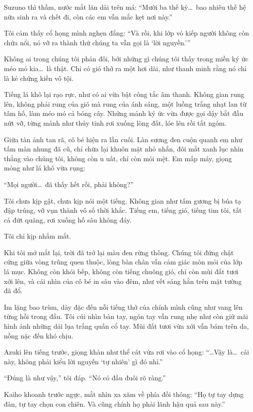 \documentclass[../main.tex]{subfiles}
\begin{document}
Suzuno thì thầm, nước mắt lăn dài trên má: ``Mười ba thế kỷ\dots\ bao nhiêu thế hệ nữa sinh ra và chết đi, còn các em vẫn mắc kẹt nơi này.''

Tôi cảm thấy cổ họng mình nghẹn đắng: ``Và rồi, khi lớp vỏ kiếp người không còn chứa nổi, nó vỡ ra thành thứ chúng ta vẫn gọi là `lời nguyền.'''

Không ai trong chúng tôi phản đối, bởi những gì chúng tôi thấy trong miền ký ức méo mó kia\dots\ là thật. Chỉ có gió thở ra một hơi dài, như thanh minh rằng nó chỉ là kẻ chứng kiến vô tội.

Tiếng lá khô lại rạo rực, như có ai vừa bật công tắc âm thanh. Không gian rung lên, không phải rung của gió mà rung của ánh sáng, một luồng trắng nhạt lan từ tâm hố, làm méo mó cả bóng cây. Những mảnh ký ức vừa được gọi dậy bắt đầu nứt vỡ, từng mảnh như thủy tinh rơi xuống lòng đất, lóe lên rồi tắt ngóm.

Giữa tàn ảnh tan rã, cô bé hiện ra lần cuối. Làn sương đen cuộn quanh em như tấm màn nhung đã cũ, chỉ chừa lại khuôn mặt nhỏ nhắn, đôi mắt xanh lục nhìn thẳng vào chúng tôi, không còn u uất, chỉ còn mỏi mệt. Em mấp máy, giọng mỏng như lá khô vừa rụng:

``Mọi người\dots\ đã thấy hết rồi, phải không?''

Tôi chưa kịp gật, chưa kịp nói một tiếng. Không gian như tấm gương bị búa tạ đập trúng, vỡ vụn thành vô số thời khắc. Tiếng em, tiếng gió, tiếng tim tôi, tất cả đứt quãng, rơi xuống hố sâu không đáy.

Tôi chỉ kịp nhắm mắt.

Khi tôi mở mắt lại, trời đã trở lại màu đen rừng thông. Chúng tôi đứng chật cứng giữa vòng trũng quen thuộc, lòng bàn chân vẫn cảm giác mòn mỏi của lớp lá mục. Không còn khói bếp, không còn tiếng chuông gió, chỉ còn mùi đất tươi xới lên, và cái nhìn của cô bé in sâu vào đêm, như vết sáng hằn trên mặt tường đã đổ.

Im lặng bao trùm, dày đặc đến nỗi tiếng thở của chính mình cũng như vang lên từng hồi trong đầu. Tôi cúi nhìn bàn tay, ngón tay vẫn rung nhẹ như còn giữ mãi hình ảnh những dải lụa trắng quấn cổ tay. Mùi đất tươi vừa xới vẫn bám trên da, nồng nặc đến khó chịu.

Azuki lên tiếng trước, giọng khàn như thể cát vừa rơi vào cổ họng: ``\dots Vậy là\dots\ cái này, không phải kiểu lời nguyền `tự nhiên' gì đó nhỉ.''

``Đúng là như vậy,'' tôi đáp. ``Nó có đầu đuôi rõ ràng.''

Kaiho khoanh trước ngực, mắt nhìn xa xăm về phía đồi thông: ``Họ tự tay dựng đàn, tự tay chọn con chiên. Và cũng chính họ phải lãnh hậu quả sau này.''
\end{document}
